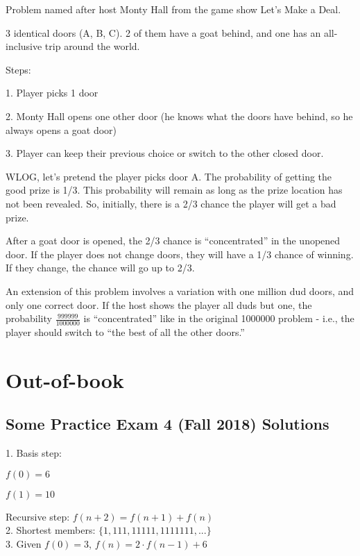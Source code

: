 \documentclass[english,openany]{book}
\begin{document}
    Problem named after host Monty Hall from the game show Let’s Make a Deal.
    
    3 identical doors (A, B, C). 2 of them have a goat behind, and one has an all-inclusive trip around the world.
    
    Steps:

    1. Player picks 1 door

    2. Monty Hall opens one other door (he knows what the doors have behind, so he always opens a goat door)
    
    3. Player can keep their previous choice or switch to the other closed door.

    WLOG, let’s pretend the player picks door A. The probability of getting the good prize is 1/3. This probability will remain as long as the prize location has not been revealed. So, initially, there is a 2/3 chance the player will get a bad prize.

    After a goat door is opened, the 2/3 chance is “concentrated” in the unopened door. If the player does not change doors, they will have a 1/3 chance of winning. If they change, the chance will go up to 2/3.

    An extension of this problem involves a variation with one million dud doors, and only one correct door. If the host shows the player all duds but one, the probability $\frac{999999}{1000000}$ is “concentrated” like in the original 1000000 problem - i.e., the player should switch to “the best of all the other doors.”

    \chapter{Out-of-book}

    \section{Some Practice Exam 4 (Fall 2018) Solutions}

    1. Basis step:

    $f(0) = 6$

    $f(1) = 10$

    Recursive step: $f(n+2) = f(n+1) + f(n)$\\

    2. Shortest members: $\{1,111,11111,1111111,...\}$\\

    3. Given $f(0) = 3$, $f(n) = 2 \cdot f(n-1) + 6$
\end{document}
